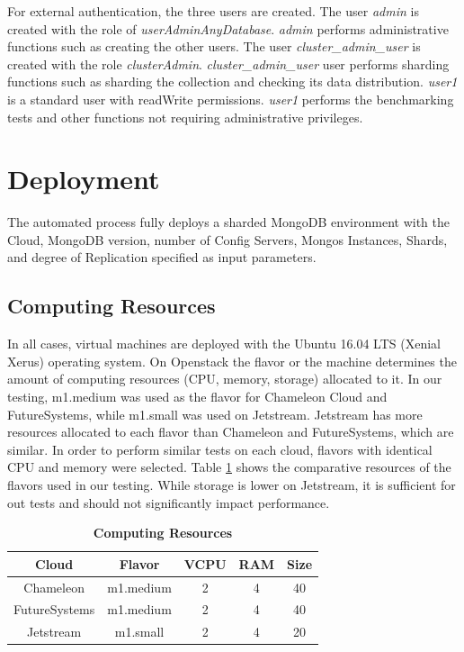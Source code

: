 \documentclass[9pt,twocolumn,twoside]{../../styles/osajnl}
\begin{document}
For external authentication, the three users are created.  The user \emph{admin} is created with the role of \emph{userAdminAnyDatabase}.  \emph{admin} performs administrative functions such as creating the other users.  The user \emph{cluster\_admin\_user} is created with the role \emph{clusterAdmin}. \emph{cluster\_admin\_user} user performs sharding functions such as sharding the collection and checking its data distribution. \emph{user1} is a standard user with readWrite permissions.  \emph{user1} performs the benchmarking tests and other functions not requiring administrative privileges.



\section{Deployment}


The automated process fully deploys a sharded MongoDB environment with the Cloud, MongoDB version, number of Config Servers, Mongos Instances, Shards, and degree of Replication specified as input parameters.

\subsection{Computing Resources}

In all cases, virtual machines are deployed with the Ubuntu 16.04 LTS (Xenial Xerus) operating system.  On Openstack the flavor or the machine determines the amount of computing resources (CPU, memory, storage) allocated to it.  In our testing, m1.medium was used as the flavor for Chameleon Cloud and FutureSystems, while  m1.small was used on Jetstream.  Jetstream has more resources allocated to each flavor than Chameleon and FutureSystems, which are similar.  In order to perform similar tests on each cloud, flavors with identical CPU and memory were selected. Table \ref{tab:computing-resources} shows the comparative resources of the flavors used in our testing.  While storage is lower on Jetstream, it is sufficient for out tests and should not significantly impact performance.

\begin{table}[htbp]
\centering
\caption{\bf Computing Resources}

 \begin{tabular}{|c | c | c | c| c|} 
 \hline
 
Cloud &  Flavor & VCPU & RAM & Size \\ [0.5ex] 
 \hline
    
Chameleon &  m1.medium & 2 & 4 &	40 \\
 \hline
FutureSystems &  m1.medium &  2 &	4 &	40 \\ 
 \hline
Jetstream &  m1.small &  2 &	4 &	20 \\ 
\hline
\end{tabular}
  \label{tab:computing-resources}
\end{table}
\end{document}
